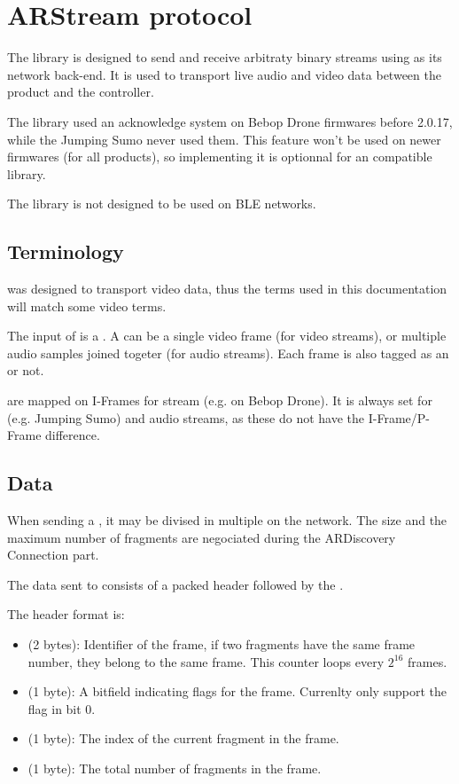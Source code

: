 \section{ARStream protocol}


The  library is designed to send and receive arbitraty binary streams using  as its network back-end. It is used to transport live audio and video data between the product and the controller.

The  library used an acknowledge system on Bebop Drone firmwares before 2.0.17, while the Jumping Sumo never used them. This feature won't be used on newer firmwares (for all products), so implementing it is optionnal for an  compatible library.


The  library is not designed to be used on BLE networks.

\subsection{Terminology}

 was designed to transport video data, thus the terms used in this documentation will match some video terms.

The input of  is a . A  can be a single video frame (for video streams), or multiple audio samples joined togeter (for audio streams). Each frame is also tagged as an  or not.

 are mapped on I-Frames for  stream (e.g. on Bebop Drone). It is always set for  (e.g. Jumping Sumo) and audio streams, as these do not have the I-Frame/P-Frame difference.

\subsection{Data}

When sending a , it may be divised in multiple  on the network. The size and the maximum number of fragments are negociated during the ARDiscovery Connection part.

The data sent to  consists of a packed header followed by the .

The header format is:
\begin{itemize}
\item{ (2 bytes): Identifier of the frame, if two fragments have the same frame number, they belong to the same frame. This counter loops every $2^{16}$ frames.}
\item{ (1 byte): A bitfield indicating flags for the frame. Currenlty only support the  flag in bit 0.}
\item{ (1 byte): The index of the current fragment in the frame.}
\item{ (1 byte): The total number of fragments in the frame.}
\end{itemize}

